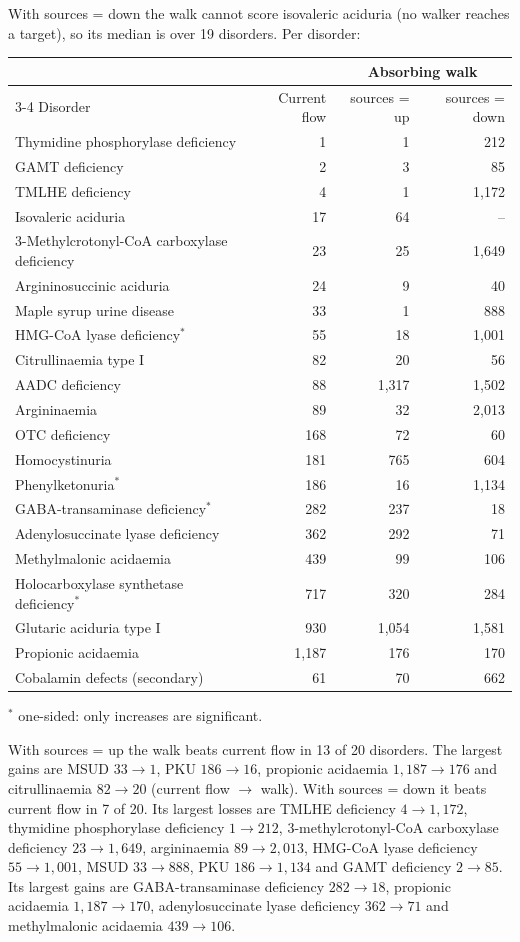\documentclass[11pt]{article}
\begin{document}
With sources = down the walk cannot score isovaleric aciduria (no walker reaches a
target), so its median is over 19 disorders. Per disorder:

\begin{center}
\small
\begin{tabular}{@{}lrrr@{}}
\toprule
 & & \multicolumn{2}{c}{Absorbing walk}\\
\cmidrule(l){3-4}
Disorder & Current flow & sources = up & sources = down\\
\midrule
Thymidine phosphorylase deficiency & 1 & 1 & 212\\
GAMT deficiency & 2 & 3 & 85\\
TMLHE deficiency & 4 & 1 & 1{,}172\\
Isovaleric aciduria & 17 & 64 & --\\
3-Methylcrotonyl-CoA carboxylase deficiency & 23 & 25 & 1{,}649\\
Argininosuccinic aciduria & 24 & 9 & 40\\
Maple syrup urine disease & 33 & 1 & 888\\
HMG-CoA lyase deficiency$^{*}$ & 55 & 18 & 1{,}001\\
Citrullinaemia type I & 82 & 20 & 56\\
AADC deficiency & 88 & 1{,}317 & 1{,}502\\
Argininaemia & 89 & 32 & 2{,}013\\
OTC deficiency & 168 & 72 & 60\\
Homocystinuria & 181 & 765 & 604\\
Phenylketonuria$^{*}$ & 186 & 16 & 1{,}134\\
GABA-transaminase deficiency$^{*}$ & 282 & 237 & 18\\
Adenylosuccinate lyase deficiency & 362 & 292 & 71\\
Methylmalonic acidaemia & 439 & 99 & 106\\
Holocarboxylase synthetase deficiency$^{*}$ & 717 & 320 & 284\\
Glutaric aciduria type I & 930 & 1{,}054 & 1{,}581\\
Propionic acidaemia & 1{,}187 & 176 & 170\\
\midrule
Cobalamin defects (secondary) & 61 & 70 & 662\\
\bottomrule
\end{tabular}

\smallskip
$^{*}$ one-sided: only increases are significant.
\end{center}

With sources = up the walk beats current flow in 13 of 20 disorders. The largest gains
are MSUD $33\to1$, PKU $186\to16$, propionic acidaemia $1{,}187\to176$ and
citrullinaemia $82\to20$ (current flow $\to$ walk). With sources = down it beats
current flow in 7 of 20. Its largest losses are TMLHE deficiency $4\to1{,}172$,
thymidine phosphorylase deficiency $1\to212$, 3-methylcrotonyl-CoA carboxylase
deficiency $23\to1{,}649$, argininaemia $89\to2{,}013$, HMG-CoA lyase deficiency
$55\to1{,}001$, MSUD $33\to888$, PKU $186\to1{,}134$ and GAMT deficiency $2\to85$. Its
largest gains are GABA-transaminase deficiency $282\to18$, propionic acidaemia
$1{,}187\to170$, adenylosuccinate lyase deficiency $362\to71$ and methylmalonic
acidaemia $439\to106$.
\end{document}
